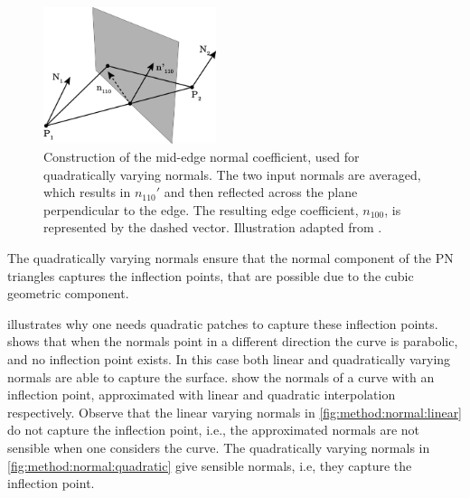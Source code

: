 	\begin{figure}
		\centering
		\includegraphics[width=0.45\textwidth]{./content/img/method/normal_reflection.png}
		\caption{Construction of the mid-edge normal coefficient, used for quadratically varying normals. The two input normals are averaged, which results in $n_{110}'$ and then reflected across the plane perpendicular to the edge. The resulting edge coefficient, $n_{100}$, is represented by the dashed vector. Illustration adapted from \textcite{vlachos2001curved}.}
		\label{fig:method:normal:reflection}
	\end{figure}


	The quadratically varying normals ensure that the normal component of the PN triangles captures the inflection points, that are possible due to the cubic geometric component. 

	 illustrates why one needs quadratic patches to capture these inflection points.  shows that when the normals point in a different direction the curve is parabolic, and no inflection point exists. In this case both linear and quadratically varying normals are able to capture the surface.  show the normals of a curve with an inflection point, approximated with linear and quadratic interpolation respectively. Observe that the linear varying normals in \cref{fig:method:normal:linear} do not capture the inflection point, i.e., the approximated normals are not sensible when one considers the curve. The quadratically varying normals in \cref{fig:method:normal:quadratic} give sensible normals, i.e, they capture the inflection point.

